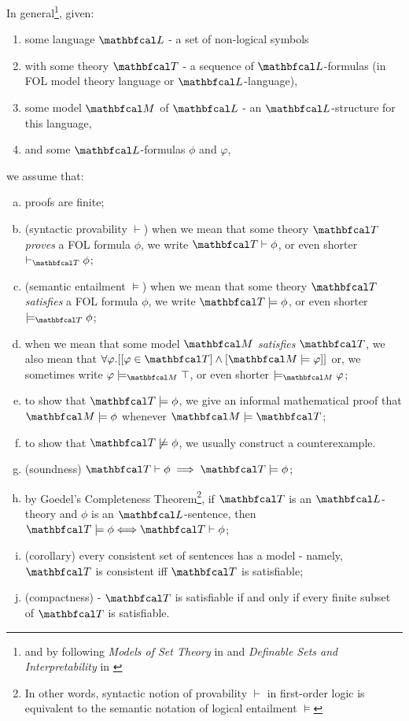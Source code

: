 In general\footnote{and by following \textit{Models of Set Theory} in \cite{jech2003set} and \textit{Definable Sets and Interpretability} in \cite{marker2002model}}, given: 
\begin{enumerate}[(1)]
  \item some language $\lsign$ - a set of non-logical symbols
  \item with some theory $\LsT$ - a sequence of $\lsign$-formulas (in FOL model theory language or $\lsign$-language), 
  \item some model $\LsM$ of $\lsign$ - an $\lsign$-structure for this language, 
  \item and some $\lsign$-formulas $\phi$ and $\varphi$,
\end{enumerate}
  we assume that:
\begin{enumerate}[(a)]
  \item proofs are finite;
  \item (syntactic provability $\vdash$) when we mean that some theory $\LsT$ \textit{proves} a FOL formula $\phi$, we write $\LsT \vdash \phi$, or even shorter $\vdash_{\LsT} \phi$;
  \item (semantic entailment $\models$) when we mean that some theory $\LsT$ \textit{satisfies} a FOL formula $\phi$, we write $\LsT \models \phi$, or even shorter $\models_{\LsT} \phi$;
  \item when we mean that some model $\LsM$ \textit{satisfies} $\LsT$, we also mean that $\forall \varphi . [[\varphi \in \LsT] \land [\LsM \models \varphi]]$ or, we sometimes write $\varphi \models_{\LsM} \top$, or even shorter $\models_{\LsM} \varphi$;
  \item to show that $\LsT \models \phi$, we give an informal mathematical proof that $\LsM \models \phi$ whenever $\LsM \models \LsT$;
  \item to show that $\LsT \not\models \phi$, we usually construct a counterexample.
  \item (soundness) $\LsT \vdash \phi \implies \LsT \models \phi$;
  \item by Goedel's Completeness Theorem\footnote{In other words, syntactic notion of provability $\vdash$ in first-order logic is equivalent to the semantic notation of logical entailment $\models$}, if $\LsT$ is an $\lsign$-theory and $\phi$ is an $\lsign$-sentence, then 
   $\LsT \models \phi \Longleftrightarrow \LsT \vdash \phi$; 
  \item (corollary) every consistent set of sentences has a model - namely, $\LsT$ is consistent iff $\LsT$ is satisfiable;
  \item (compactness) - $\LsT$ is satisfiable if and only if every finite subset of $\LsT$ is satisfiable.
\end{enumerate}



